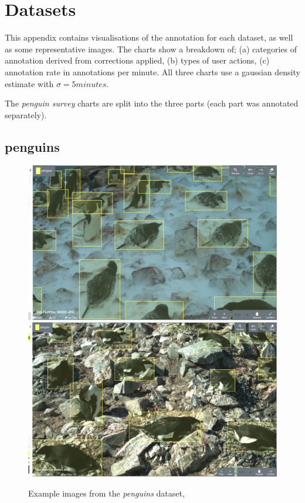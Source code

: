 \chapter{Datasets}
\label{chap:datasets} 

This appendix contains visualisations of the annotation for each dataset, as well as some representative images. The charts show a breakdown of; (a) categories of annotation derived from corrections applied, (b) types of user actions, (c) annotation rate in annotations per minute. All three charts use a gaussian density estimate with $\sigma=5 minutes$. 

The \emph{penguin survey} charts are split into the three parts (each part was annotated separately).

\newpage
\section{penguins}
\label{sec:penguins_details}

\begin{figure}[!h]
\centering
  \includegraphics[width=0.475\linewidth]{figures/annotation/screenshots/penguins.png}
  \hfill
  \includegraphics[width=0.475\linewidth]{figures/annotation/screenshots/penguins2.png}

\caption{Example images from the \emph{penguins} dataset, \cite{PenguinData}}
\label{fig:penguin_dataset}
\end{figure}

